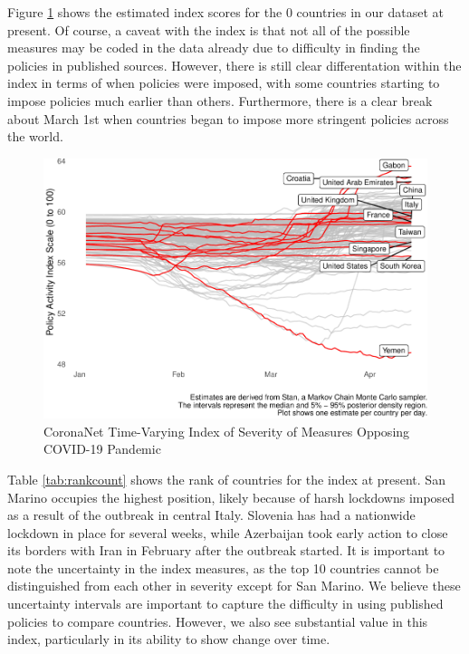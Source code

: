 \documentclass[]{article}
\begin{document}
Figure \ref{fig:plotindex} shows the estimated index scores for the 0 countries in our dataset at present. Of course, a caveat with the index is that not all of the possible measures may be coded in the data already due to difficulty in finding the policies in published sources. However, there is still clear differentation within the index in terms of when policies were imposed, with some countries starting to impose policies much earlier than others. Furthermore, there is a clear break about March 1st when countries began to impose more stringent policies across the world.

\begin{figure}
\centering
\includegraphics{corona_wp_files/figure-latex/plotindex-1.pdf}
\caption{\label{fig:plotindex}CoronaNet Time-Varying Index of Severity of Measures Opposing COVID-19 Pandemic}
\end{figure}

Table \ref{tab:rankcount} shows the rank of countries for the index at present. San Marino occupies the highest position, likely because of harsh lockdowns imposed as a result of the outbreak in central Italy. Slovenia has had a nationwide lockdown in place for several weeks, while Azerbaijan took early action to close its borders with Iran in February after the outbreak started. It is important to note the uncertainty in the index measures, as the top 10 countries cannot be distinguished from each other in severity except for San Marino. We believe these uncertainty intervals are important to capture the difficulty in using published policies to compare countries. However, we also see substantial value in this index, particularly in its ability to show change over time.
\end{document}
